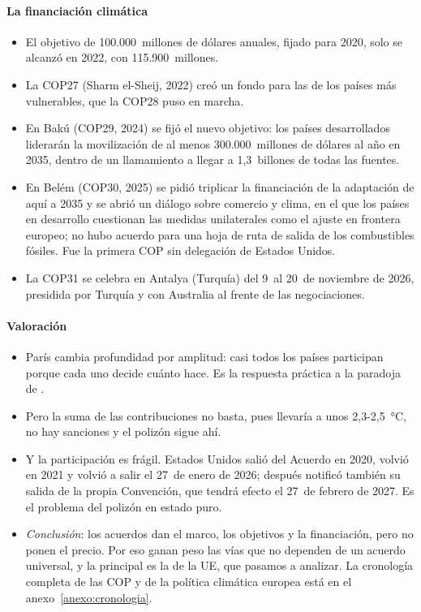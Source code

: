 \documentclass[11pt]{article}
\begin{document}
\paragraph{La financiación climática}

\begin{itemize}
\item El objetivo de 100.000~millones de dólares anuales, fijado para 2020, solo se alcanzó en 2022, con 115.900~millones\nocite{OCDE2024Financiacion}.
\item La COP27 (Sharm el-Sheij, 2022) creó un fondo para las  de los países más vulnerables, que la COP28 puso en marcha\nocite{CMNUCC2023Balance}.
\item En Bakú (COP29, 2024) se fijó el nuevo objetivo: los países desarrollados liderarán la movilización de al menos 300.000~millones de dólares al año en 2035, dentro de un llamamiento a llegar a 1,3~billones de todas las fuentes\nocite{CMNUCC2024NCQG}.
\item En Belém (COP30, 2025) se pidió triplicar la financiación de la adaptación de aquí a 2035 y se abrió un diálogo sobre comercio y clima, en el que los países en desarrollo cuestionan las medidas unilaterales como el ajuste en frontera europeo; no hubo acuerdo para una hoja de ruta de salida de los combustibles fósiles. Fue la primera COP sin delegación de Estados Unidos\nocite{CMNUCC2025Belem,C2ES2026COP30}.
\item La COP31 se celebra en Antalya (Turquía) del 9~al 20~de noviembre de 2026, presidida por Turquía y con Australia al frente de las negociaciones\nocite{CMNUCC2026COP31,C2ES2026COP30}.
\end{itemize}

\paragraph{Valoración}

\begin{itemize}
\item París cambia profundidad por amplitud: casi todos los países participan porque cada uno decide cuánto hace. Es la respuesta práctica a la paradoja de .
\item Pero la suma de las contribuciones no basta, pues llevaría a unos 2,3-2,5~°C, no hay sanciones y el polizón sigue ahí\nocite{UNEP2025Emissions}.
\item Y la participación es frágil. Estados Unidos salió del Acuerdo en 2020, volvió en 2021 y volvió a salir el 27~de enero de 2026\nocite{ONU2025RetiradaParis}; después notificó también su salida de la propia Convención, que tendrá efecto el 27~de febrero de 2027\nocite{ONU2026RetiradaCMNUCC}. Es el problema del polizón en estado puro.
\item \emph{Conclusión}: los acuerdos dan el marco, los objetivos y la financiación, pero no ponen el precio. Por eso ganan peso las vías que no dependen de un acuerdo universal, y la principal es la de la UE, que pasamos a analizar. La cronología completa de las COP y de la política climática europea está en el anexo~\ref{anexo:cronologia}.
\end{itemize}
\end{document}
